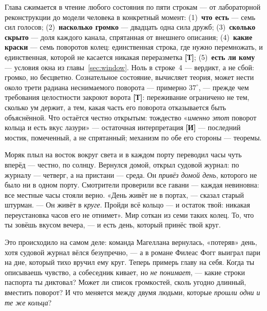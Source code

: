 \documentclass[11pt,letterpaper]{article}
\newcommand{\stT}{\textbf{[Т]}\xspace}
\newcommand{\stI}{\textbf{[И]}\xspace}
\begin{document}
\begin{factbox}
Глава сжимается в чтение любого состояния по пяти строкам --- от
лабораторной реконструкции до модели человека в конкретный момент:
(1)~\textbf{что есть} --- семь сил голосов; (2)~\textbf{насколько
громко} --- двадцать одна сила дружб; (3)~\textbf{сколько скрыто}
--- доля каждого канала, спрятанная от внешнего описания;
(4)~\textbf{какие краски} --- семь поворотов колец: единственная
строка, где нужно перемножать, и единственная, которой не касается
никакая переразметка \stT; (5)~\textbf{есть ли кому} --- условия
окна из главы~\ref{sec:window}. Ноль в строке~4 --- вердикт, а не
сбой: громко, но бесцветно. Сознательное состояние, вычисляет
теория, может нести около трети радиана неснимаемого поворота ---
примерно $37^\circ$, --- прежде чем требования целостности закроют
ворота \stT: переживание ограничено не тем, сколько ум держит, а
тем, какая часть его поворота отказывается быть объяснённой. Что
остаётся честно открытым: тождество «\emph{именно этот} поворот
кольца и есть вкус лазури» --- остаточная интерпретация \stI{} ---
последний мостик, помеченный, а не спрятанный; механизм по обе его
стороны --- теоремы.
\end{factbox}

\begin{skazbox}
Моряк плыл на восток вокруг света и в каждом порту переводил часы
чуть вперёд --- честно, по солнцу. Вернулся домой, открыл судовой
журнал: по журналу --- четверг, а на пристани --- среда. Он
\emph{привёз домой день}, которого не было ни в одном порту.
Смотрители проверили все гавани --- каждая невиновна: все местные
часы стояли верно. «День живёт не в портах, --- сказал старый
штурман. --- Он живёт в \emph{круге}. Пройди всё кольцо --- и
остаток твой: никакая переустановка часов его не отнимет». Мир
соткан из семи таких колец. То, что ты зовёшь вкусом вечера, --- и
есть день, который принёс твой круг.
\end{skazbox}

\begin{askbox}
Это происходило на самом деле: команда Магеллана вернулась,
«потеряв» день, хотя судовой журнал вёлся безупречно, --- а в романе
Филеас Фогг выиграл пари на дне, который тихо вручил ему круг.
Теперь примерь главу на себя. Когда ты описываешь чувство, а
собеседник кивает, но \emph{не понимает}, --- какие строки паспорта
ты диктовал? Может ли список громкостей, сколь угодно длинный,
вместить поворот? И что меняется между двумя людьми, которые
\emph{прошли одни и те же кольца}?
\end{askbox}
\end{document}
